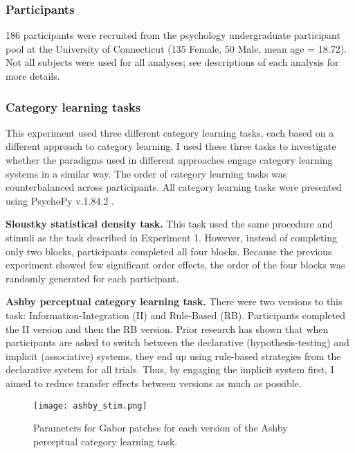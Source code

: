 \documentclass[../dissertation.tex]{subfiles}
\begin{document}
\subsubsection{Participants}
186 participants were recruited from the psychology undergraduate participant pool at the University of Connecticut (135 Female, 50 Male, mean age = 18.72). Not all subjects were used for all analyses; see descriptions of each analysis for more details.
\subsubsection{Category learning tasks}
This experiment used three different category learning tasks, each based on a different approach to category learning. I used these three tasks to investigate whether the paradigms used in different approaches engage category learning systems in a similar way. The order of category learning tasks was counterbalanced across participants. All category learning tasks were presented using PsychoPy v.1.84.2 \citep{Peirce2007}. \par 
\textbf{Sloustky statistical density task.} This task used the same procedure and stimuli as the task described in Experiment 1. However, instead of completing only two blocks, participants completed all four blocks. Because the previous experiment showed few significant order effects, the order of the four blocks was randomly generated for each participant. \par
\textbf{Ashby perceptual category learning task.} There were two versions to this task: Information-Integration (II) and Rule-Based (RB). Participants completed the II version and then the RB version. Prior research has shown that when participants are asked to switch between the declarative (hypothesis-testing) and implicit (associative) systems, they end up using rule-based strategies from the declarative system for all trials. Thus, by engaging the implicit system first, I aimed to reduce transfer effects between versions as much as possible. \par

\begin{wrapfigure}{L}{0.625\textwidth}
\vspace{-10pt}
\texttt{[image: ashby\_stim.png]}
\caption[Stimulus parameters for Ashby perceptual category learning task]{Parameters for Gabor patches for each version of the Ashby perceptual category learning task. }
\label{ashby_param}
\vspace{-20pt}
\end{wrapfigure}	
\end{document}
